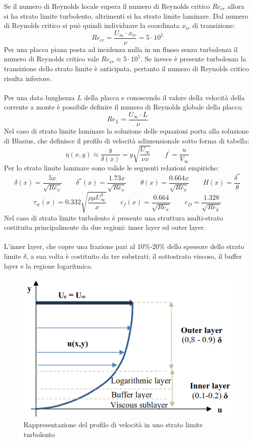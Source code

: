 \noindent Se il numero di Reynolds locale supera il numero di Reynolds critico $Re_{cr}$ allora si ha strato limite turbolento, altrimenti si ha strato limite laminare. Dal numero di Reynolds critico si può quindi individuare la coordinata $x_{tr}$ di transizione:
\begin{equation*}
    Re_{cr}=\frac{U_\infty \cdot x_{tr}}{\nu}=5\cdot10^5
\end{equation*}
Per una placca piana posta ad incidenza nulla in un flusso senza turbolenza il numero di Reynolds critico vale $Re_{cr}\approx5\cdot10^5$. Se invece è presente turbolenza la transizione dello strato limite è anticipata, pertanto il numero di Reynolds critico risulta inferiore.\\\\
Per una data lunghezza $L$ della placca e conoscendo il valore della velocità della corrente a monte è possibile definire il numero di Reynolds globale della placca:
\begin{equation*}
    Re_L = \frac{U_\infty \cdot L}{\nu}
\end{equation*}
Nel caso di strato limite laminare la soluzione delle equazioni porta alla soluzione di Blasius, che definisce il profilo di velocità adimensionale sotto forma di tabella:
\begin{equation*}
    \eta(x,y) \approx \frac{y}{\delta(x)} = y\sqrt{\frac{U_\infty}{\nu x}} \qquad f^\prime = \frac{u}{V_\infty}
\end{equation*}
Per lo strato limite laminare sono valide le seguenti relazioni empiriche:
\begin{equation*}
    \delta(x) = \frac{5x}{\sqrt{Re_x}} \qquad \delta^*(x) = \frac{1.73x}{\sqrt{Re_x}} \qquad \theta(x) = \frac{0.664x}{\sqrt{Re_x}} \qquad H(x) = \frac{\delta^*}{\theta}
\end{equation*}
\begin{equation*}
    \tau_w(x) = 0.332 \sqrt{\frac{\rho \mu U_\infty^3}x} \qquad c_f(x) = \frac{0.664}{\sqrt{Re_x}} \qquad c_D = \frac{1.328}{\sqrt{Re_L}}
\end{equation*}
Nel caso di strato limite turbolento è presente una struttura multi-strato costituita principalmente da due regioni: inner layer ed outer layer.\\\\
L'inner layer, che copre una frazione pari al 10\%-20\% dello spessore dello strato limite $\delta$, a sua volta è costituito da tre substrati: il sottostrato viscoso, il buffer layer e la regione logaritmica.
\begin{figure}[H]
    \centering
    \includegraphics[width=.55\textwidth]{images/9/sltimage.png}
    \caption{Rappresentazione del profilo di velocità in uno strato limite turbolento}
\end{figure}

